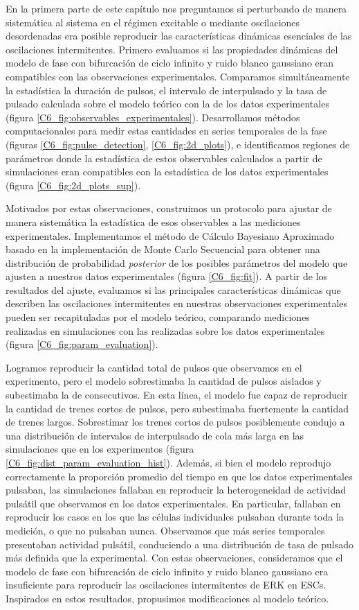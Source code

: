 \documentclass[./main.tex]{subfiles}
\begin{document}
En la primera parte de este capítulo nos preguntamos si perturbando de manera sistemática al sistema en el régimen excitable o mediante oscilaciones desordenadas era posible reproducir las características dinámicas esenciales de las oscilaciones intermitentes. Primero evaluamos si las propiedades dinámicas del modelo de fase con bifurcación de ciclo infinito y ruido blanco gaussiano eran compatibles con las observaciones experimentales. Comparamos simultáneamente la estadística la duración de pulsos, el intervalo de interpulsado y la tasa de pulsado calculada sobre el modelo teórico con la de los datos experimentales (figura \ref{C6_fig:observables_experimentales}). Desarrollamos métodos computacionales para medir estas cantidades en series temporales de la fase (figuras \ref{C6_fig:pulse_detection}, \ref{C6_fig:2d_plots}), e identificamos regiones de parámetros donde la estadística de estos observables calculados a partir de simulaciones eran compatibles con la estadística de los datos experimentales (figura \ref{C6_fig:2d_plots_sup}). 


Motivados por estas observaciones, construimos un protocolo para ajustar de manera sistemática la estadística de esos observables a las mediciones experimentales. Implementamos el método de Cálculo Bayesiano Aproximado basado en la implementación de Monte Carlo Secuencial para obtener una distribución de probabilidad \textit{posterior} de los posibles parámetros del modelo que ajusten a nuestros datos experimentales (figura \ref{C6_fig:fit}). A partir de los resultados del ajuste, evaluamos si las principales características dinámicas que describen las oscilaciones intermitentes en nuestras observaciones experimentales pueden ser recapituladas por el modelo teórico, comparando mediciones realizadas en simulaciones con las realizadas sobre los datos experimentales (figura \ref{C6_fig:param_evaluation}). 

Logramos reproducir la cantidad total de pulsos que observamos en el experimento, pero el modelo sobrestimaba la cantidad de pulsos aislados y subestimaba la de consecutivos. En esta línea, el modelo fue capaz de reproducir la cantidad de trenes cortos de pulsos, pero subestimaba fuertemente la cantidad de trenes largos. Sobrestimar los trenes cortos de pulsos posiblemente condujo a una distribución de intervalos de interpulsado de cola más larga en las simulaciones que en los experimentos (figura \ref{C6_fig:dist_param_evaluation_hist}). Además, si bien el modelo reprodujo correctamente la proporción promedio del tiempo en que los datos experimentales pulsaban, las simulaciones fallaban en reproducir la heterogeneidad de actividad pulsátil que observamos en los datos experimentales. En particular, fallaban en reproducir los casos en los que las células individuales pulsaban durante toda la medición, o que no pulsaban nunca. Observamos que más series temporales presentaban actividad pulsátil, conduciendo a una distribución de tasa de pulsado más definida que la experimental. Con estas observaciones, consideramos que el modelo de fase con bifurcación de ciclo infinito y ruido blanco gaussiano era insuficiente para reproducir las oscilaciones intermitentes de ERK en ESCs. Inspirados en estos resultados, propusimos modificaciones al modelo teórico.
\end{document}
